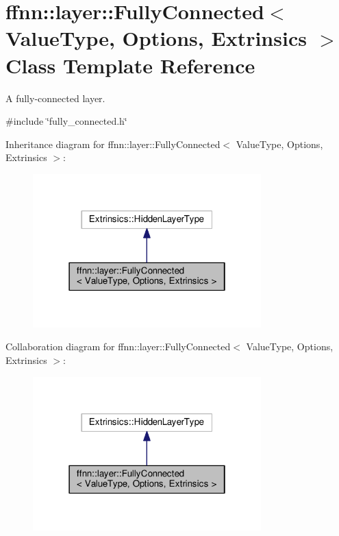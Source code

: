 \hypertarget{classffnn_1_1layer_1_1_fully_connected}{\section{ffnn\-:\-:layer\-:\-:Fully\-Connected$<$ Value\-Type, Options, Extrinsics $>$ Class Template Reference}
\label{classffnn_1_1layer_1_1_fully_connected}
}


A fully-\/connected layer.  




{\ttfamily \#include \char`\"{}fully\-\_\-connected.\-h\char`\"{}}



Inheritance diagram for ffnn\-:\-:layer\-:\-:Fully\-Connected$<$ Value\-Type, Options, Extrinsics $>$\-:\nopagebreak
\begin{figure}[H]
\begin{center}
\leavevmode
\includegraphics[width=250pt]{classffnn_1_1layer_1_1_fully_connected__inherit__graph}
\end{center}
\end{figure}


Collaboration diagram for ffnn\-:\-:layer\-:\-:Fully\-Connected$<$ Value\-Type, Options, Extrinsics $>$\-:\nopagebreak
\begin{figure}[H]
\begin{center}
\leavevmode
\includegraphics[width=250pt]{classffnn_1_1layer_1_1_fully_connected__coll__graph}
\end{center}
\end{figure}
